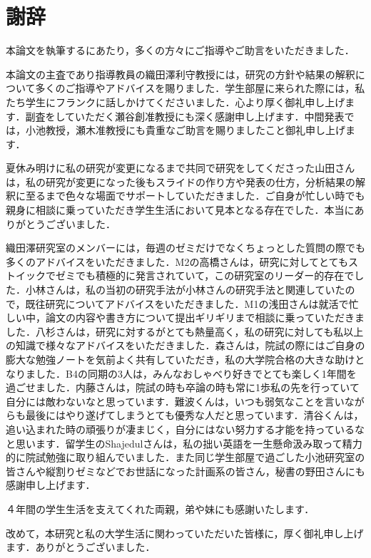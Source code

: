 \chapter*{謝辞}

本論文を執筆するにあたり，多くの方々にご指導やご助言をいただきました．

本論文の主査であり指導教員の織田澤利守教授には，研究の方針や結果の解釈について多くのご指導やアドバイスを賜りました．学生部屋に来られた際には，私たち学生にフランクに話しかけてくださいました．心より厚く御礼申し上げます．副査をしていただく瀬谷創准教授にも深く感謝申し上げます．中間発表では，小池教授，瀬木准教授にも貴重なご助言を賜りましたこと御礼申し上げます．

夏休み明けに私の研究が変更になるまで共同で研究をしてくださった山田さんは，私の研究が変更になった後もスライドの作り方や発表の仕方，分析結果の解釈に至るまで色々な場面でサポートしていただきました．ご自身が忙しい時でも親身に相談に乗っていただき学生生活において見本となる存在でした．本当にありがとうございました．

織田澤研究室のメンバーには，毎週のゼミだけでなくちょっとした質問の際でも多くのアドバイスをいただきました．M2の高橋さんは，研究に対してとてもストイックでゼミでも積極的に発言されていて，この研究室のリーダー的存在でした．小林さんは，私の当初の研究手法が小林さんの研究手法と関連していたので，既往研究についてアドバイスをいただきました．M1の浅田さんは就活で忙しい中，論文の内容や書き方について提出ギリギリまで相談に乗っていただきました．八杉さんは，研究に対するがとても熱量高く，私の研究に対しても私以上の知識で様々なアドバイスをいただきました．森さんは，院試の際にはご自身の膨大な勉強ノートを気前よく共有していただき，私の大学院合格の大きな助けとなりました．B4の同期の3人は，みんなおしゃべり好きでとても楽しく1年間を過ごせました．内藤さんは，院試の時も卒論の時も常に1歩私の先を行っていて自分には敵わないなと思っています．難波くんは，いつも弱気なことを言いながらも最後にはやり遂げてしまうとても優秀な人だと思っています．清谷くんは，追い込まれた時の頑張りが凄まじく，自分にはない努力する才能を持っているなと思います．留学生のShajedulさんは，私の拙い英語を一生懸命汲み取って精力的に院試勉強に取り組んでいました．また同じ学生部屋で過ごした小池研究室の皆さんや縦割りゼミなどでお世話になった計画系の皆さん，秘書の野田さんにも感謝申し上げます．

４年間の学生生活を支えてくれた両親，弟や妹にも感謝いたします．

改めて，本研究と私の大学生活に関わっていただいた皆様に，厚く御礼申し上げます．ありがとうございました．